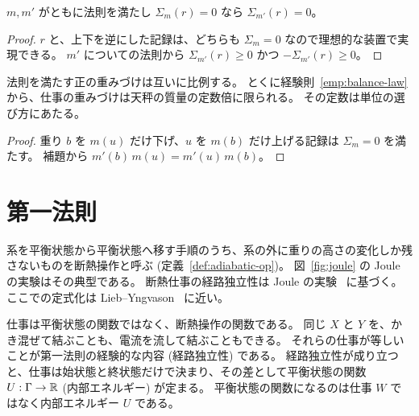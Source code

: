 \begin{lemma}[釣り合う動かし方は重みづけによらない]
  \label{lem:mech-zero}
  \leanok
  $m, m'$ がともに法則を満たし $\Sigma_m(r) = 0$ なら $\Sigma_{m'}(r) = 0$。
\end{lemma}

\begin{proof}
  \leanok
  $r$ と、上下を逆にした記録は、どちらも $\Sigma_m = 0$ なので理想的な装置で実現できる。
  $m'$ についての法則から $\Sigma_{m'}(r) \ge 0$ かつ $-\Sigma_{m'}(r) \ge 0$。
\end{proof}

\begin{theorem}[仕事の重みづけの一意性]
  \label{thm:mech-compatible}
  \leanok
  法則を満たす正の重みづけは互いに比例する。
  とくに経験則~\ref{emp:balance-law} から、仕事の重みづけは天秤の質量の定数倍に限られる。
  その定数は単位の選び方にあたる。
\end{theorem}

\begin{proof}
  \leanok
  重り $b$ を $m(u)$ だけ下げ、$u$ を $m(b)$ だけ上げる記録は $\Sigma_m = 0$ を満たす。
  補題から $m'(b)\, m(u) = m'(u)\, m(b)$。
\end{proof}

\chapter{第一法則}

系を平衡状態から平衡状態へ移す手順のうち、系の外に重りの高さの変化しか残さないものを断熱操作と呼ぶ (定義~\ref{def:adiabatic-op})。
図~\ref{fig:joule} の Joule の実験はその典型である。
断熱仕事の経路独立性は Joule の実験~\cite{Joule1850} に基づく。
ここでの定式化は Lieb--Yngvason~\cite[§2.4]{LY99} に近い。

仕事は平衡状態の関数ではなく、断熱操作の関数である。
同じ $X$ と $Y$ を、かき混ぜて結ぶことも、電流を流して結ぶこともできる。
それらの仕事が等しいことが第一法則の経験的な内容 (経路独立性) である。
経路独立性が成り立つと、仕事は始状態と終状態だけで決まり、その差として平衡状態の関数 $U : \Gamma \to \mathbb{R}$ (内部エネルギー) が定まる。
平衡状態の関数になるのは仕事 $W$ ではなく内部エネルギー $U$ である。

